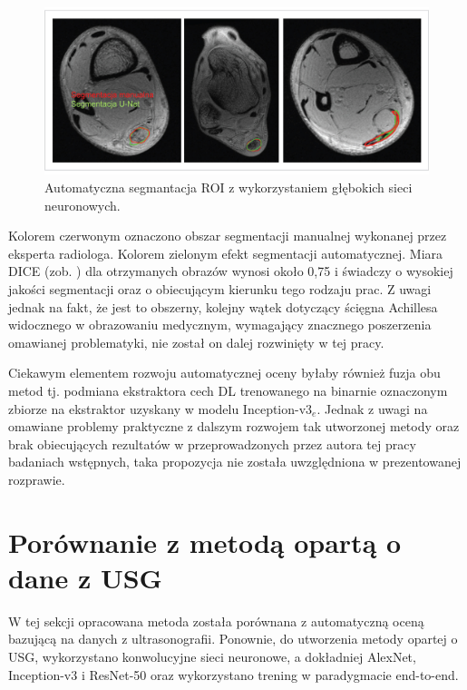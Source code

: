 \begin{figure}[h]
	\centering
	\includegraphics[width=1\textwidth]{figures/Segmentacja.jpg}
	\caption{Automatyczna segmantacja ROI z wykorzystaniem głębokich sieci neuronowych.}\label{fig:segmentacja}
\end{figure}

Kolorem czerwonym oznaczono obszar segmentacji manualnej wykonanej przez eksperta radiologa. Kolorem zielonym efekt segmentacji automatycznej. Miara DICE (zob. \cite{Zou2004}) dla otrzymanych obrazów wynosi około 0,75 i świadczy o wysokiej jakości segmentacji oraz o obiecującym kierunku tego rodzaju prac. Z uwagi jednak na fakt, że jest to obszerny, kolejny wątek dotyczący ścięgna Achillesa widocznego w obrazowaniu medycznym, wymagający znacznego poszerzenia omawianej problematyki, nie został on dalej rozwinięty w tej pracy.

Ciekawym elementem rozwoju automatycznej oceny byłaby również fuzja obu metod tj. podmiana ekstraktora cech DL trenowanego na binarnie oznaczonym zbiorze na ekstraktor uzyskany w modelu Inception-v3$_e$. Jednak z uwagi na omawiane problemy praktyczne z dalszym rozwojem tak utworzonej metody oraz brak obiecujących rezultatów w przeprowadzonych przez autora tej pracy badaniach wstępnych, taka propozycja nie została uwzględniona w prezentowanej rozprawie. 

\section{Porównanie z metodą opartą o dane z USG}
\label{seq:comp-usg}
W tej sekcji opracowana metoda została porównana z automatyczną oceną bazującą na danych z ultrasonografii. Ponownie, do utworzenia metody opartej o USG, wykorzystano konwolucyjne sieci neuronowe, a dokładniej AlexNet, Inception-v3 \linebreak i ResNet-50 oraz wykorzystano trening w paradygmacie end-to-end. 

